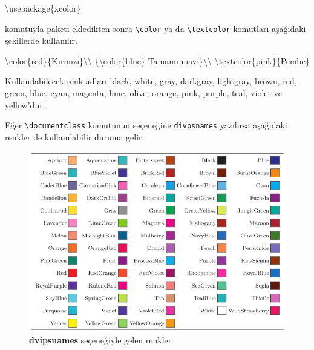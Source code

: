 \documentclass[
  10pt,
]{scrbook}
\newenvironment{Shaded}{}{}
\newcommand{\BuiltInTok}[1]{#1}
\newcommand{\ExtensionTok}[1]{#1}
\newcommand{\FunctionTok}[1]{\textcolor[rgb]{0.02,0.16,0.49}{#1}}
\newcommand{\NormalTok}[1]{#1}
\theoremstyle{definition}
\theoremstyle{definition}
\theoremstyle{definition}
\theoremstyle{definition}
\theoremstyle{remark}
\begin{document}
\begin{Shaded}
\begin{Highlighting}[]
\BuiltInTok{\textbackslash{}usepackage}\NormalTok{\{}\ExtensionTok{xcolor}\NormalTok{\}}
\end{Highlighting}
\end{Shaded}

komutuyla paketi ekledikten sonra \texttt{\textbackslash{}color} ya da \texttt{\textbackslash{}textcolor} komutları aşağıdaki şekillerde kullanılır.

\begin{Shaded}
\begin{Highlighting}[]
\FunctionTok{\textbackslash{}color}\NormalTok{\{red\}\{Kırmızı\}}\FunctionTok{\textbackslash{}\textbackslash{}}
\NormalTok{\{}\FunctionTok{\textbackslash{}color}\NormalTok{\{blue\} Tamamı mavi\}}\FunctionTok{\textbackslash{}\textbackslash{}}
\FunctionTok{\textbackslash{}textcolor}\NormalTok{\{pink\}\{Pembe\}}
\end{Highlighting}
\end{Shaded}

Kullanılabilecek renk adları black, white, gray, darkgray, lightgray, brown, red, green, blue, cyan, magenta, lime, olive, orange, pink, purple, teal, violet ve yellow'dur.

Eğer \texttt{\textbackslash{}documentclass} komutunun seçeneğine \texttt{divpsnames} yazılırsa aşağıdaki renkler de kullanılabilir duruma gelir.

\begin{figure}
\centering
\includegraphics[width=1\textwidth,height=\textheight]{images/renkler.png}
\caption{\textbf{dvipsnames} seçeneğiyle gelen renkler}
\end{figure}
\end{document}
